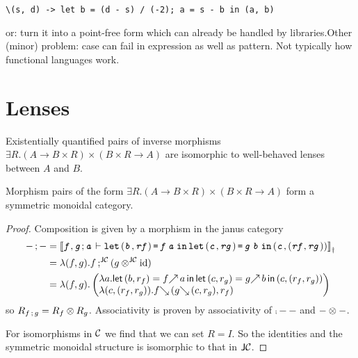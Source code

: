 \documentclass[runningheads,envcountsame]{llncs}
\begin{document}
\texttt{\textbackslash(s, d) -> let b = (d - s) / (-2); a = s - b in (a, b)}

or: turn it into a point-free form which can already be handled by libraries.Other (minor) problem: case can fail in expression as well as pattern. Not typically how functional languages work.



\section{Lenses}

\begin{lemma} \label{lem:lensex-is-lens}
    Existentially quantified pairs of inverse morphisms $\exists R. (A \to B \times R) \times (B \times R \to A)$ are isomorphic to well-behaved lenses between $A$ and $B$.
\end{lemma}

\begin{lemma} \label{lem:lensex-is-category}
    Morphism pairs of the form $\exists R. (A \to B \times R) \times (B \times R \to A)$ form a symmetric monoidal category.
\end{lemma}
\begin{proof}
    Composition is given by a morphism in the janus category \begin{align*}
        \comp{-}{-} &= \semD{\evar{f}, \evar{g}; \evar{a} \vdash \elet{\epair{\evar{b}}{\evar{rf}}}{\eapp{\evar{f}}{\evar{a}}}{\elet{\epair{\evar{c}}{\evar{rg}}}{\eapp{\evar{g}}{\evar{b}}}{\epair{\evar{c}}{\epair{\evar{rf}}{\evar{rg}}}}}} \\
        &= \lambda (f, g). \comp[\JC]{f}{(\tensor[\JC]{g}{\id})} \\
        &= \lambda (f, g). \janus{
            \lambda a. \nlet{(b, r_f)}{\f{f}\,a}{\nlet{(c, r_g)}{\f{g}\,b}{(c, (r_f, r_g))}}}{
            \lambda (c, (r_f, r_g)). \b{f}\,(\b{g}\,(c, r_g), r_f)}
    \end{align*} so $R_{\comp{f}{g}} = \tensor{R_f}{R_g}$. Associativity is proven by associativity of $\comp{-}{-}$ and $\tensor{-}{-}$.
    
    For isomorphisms in $\mathcal{C}$ we find that we can set $R = I$. So the identities and the symmetric monoidal structure is isomorphic to that in $\mathsf{J}\mathcal{C}$.
\end{proof}
\end{document}
